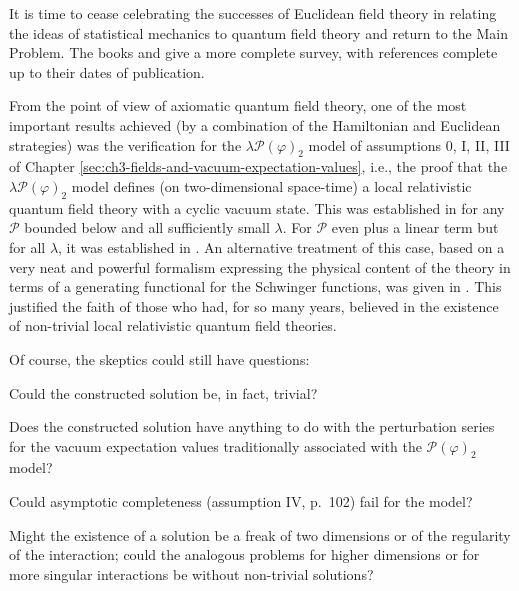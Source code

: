 

It is time to cease celebrating the successes of Euclidean field theory in
relating the ideas of statistical mechanics to quantum field theory and return
to the Main Problem. The books \cite{pct-app-43} and \cite{pct-app-44} give a more complete survey, with
references complete up to their dates of publication.

From the point of view of axiomatic quantum field theory, one of the most
important results achieved (by a combination of the Hamiltonian and Euclidean
strategies) was the verification for the $\lambda\mathcal{P}(\varphi)_2$ model
of assumptions 0, I, II, III of Chapter \ref{sec:ch3-fields-and-vacuum-expectation-values}, i.e., the proof that the
$\lambda\mathcal{P}(\varphi)_2$ model defines (on two-dimensional space-time)
a local relativistic quantum field theory with a cyclic vacuum state. This was
established in \cite{pct-app-45} for any $\mathcal{P}$ bounded below and all sufficiently
small $\lambda$. For $\mathcal{P}$ even plus a linear term but for all
$\lambda$, it was established in \cite{pct-app-37,pct-app-38,pct-app-44}. An
alternative treatment of this case, based on a very neat and powerful
formalism expressing the physical content of the theory in terms of a
generating functional for the Schwinger functions, was given in \cite{pct-app-46,pct-app-47}. This
justified the faith of those who had, for so many years, believed in the
existence of non-trivial local relativistic quantum field theories.

Of course, the skeptics could still have questions:

Could the constructed solution be, in fact, trivial?

Does the constructed solution have anything to do with the perturbation series
for the vacuum expectation values traditionally associated with the
$\mathcal{P}(\varphi)_2$ model?

Could asymptotic completeness (assumption IV, p.~102) fail for the model?

Might the existence of a solution be a freak of two dimensions or of the
regularity of the interaction; could the analogous problems for higher
dimensions or for more singular interactions be without non-trivial
solutions?

